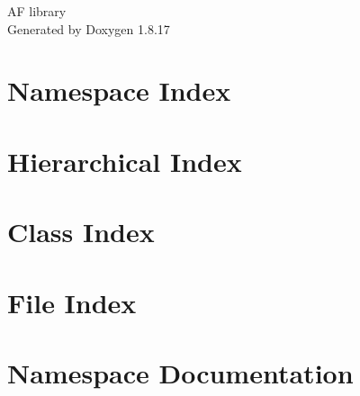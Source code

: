 \let\mypdfximage\pdfximage\def\pdfximage{\immediate\mypdfximage}\documentclass[twoside]{book}
\newcommand{\+}{\discretionary{\mbox{\scriptsize$\hookleftarrow$}}{}{}}
\newcommand{\clearemptydoublepage}{%
  \newpage{\pagestyle{empty}\cleardoublepage}%
}
\begin{document}
\hypersetup{pageanchor=false,
             bookmarksnumbered=true,
             pdfencoding=unicode
            }
\begin{titlepage}
\vspace*{7cm}
\begin{center}%
{\Large AF library }\\
\vspace*{1cm}
{\large Generated by Doxygen 1.8.17}\\
\end{center}
\end{titlepage}
\clearemptydoublepage
{}
\tableofcontents
\clearemptydoublepage
{}
\hypersetup{pageanchor=true}

\chapter{Namespace Index}

\chapter{Hierarchical Index}

\chapter{Class Index}

\chapter{File Index}

\chapter{Namespace Documentation}







\end{document}

